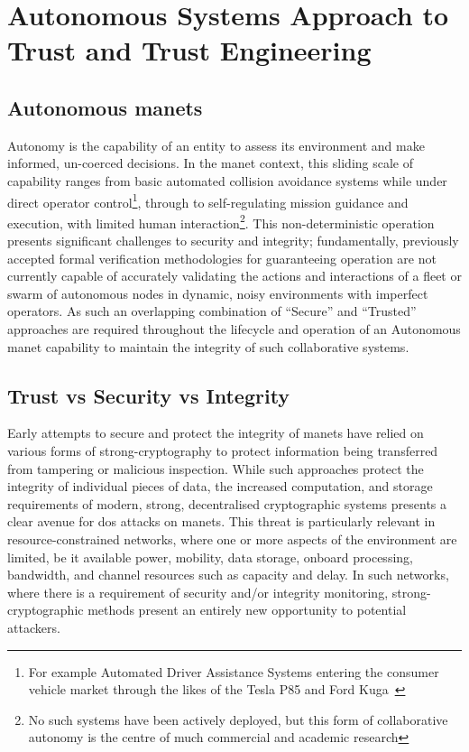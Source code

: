 \section{Autonomous Systems Approach to Trust and Trust Engineering}

\subsection{Autonomous \glspl{manet}}
Autonomy is the capability of an entity to assess its environment and make informed, un-coerced decisions.
In the \gls{manet} context, this sliding scale of capability ranges from basic automated collision avoidance systems while under direct operator control\footnote{For example Automated Driver Assistance Systems entering the consumer vehicle market through the likes of the Tesla P85 and Ford Kuga~\cite{Sawade2016}}, through to self-regulating mission guidance and execution, with limited human interaction\footnote{No such systems have been actively deployed, but this form of collaborative autonomy is the centre of much commercial and academic research\cite{Rajesh2015,Autefage2015,Teke2015}}.
This non-deterministic operation presents significant challenges to security and integrity; fundamentally, previously accepted formal verification methodologies for guaranteeing operation are not currently capable of accurately validating the actions and interactions of a fleet or swarm of autonomous nodes in dynamic, noisy environments with imperfect operators\cite{Teke2015}. 
As such an overlapping combination of ``Secure'' and ``Trusted'' approaches are required throughout the lifecycle and operation of an Autonomous \gls{manet} capability to maintain the integrity of such collaborative systems.

\subsection{Trust vs Security vs Integrity}

Early attempts to secure and protect the integrity of \glspl{manet} have relied on various forms of strong-cryptography to protect information being transferred from tampering or malicious inspection.
While such approaches protect the integrity of individual pieces of data, the increased computation, and storage requirements of modern, strong, decentralised cryptographic systems presents a clear avenue for \gls{dos} attacks on \glspl{manet}.
This threat is particularly relevant in resource-constrained networks, where one or more aspects of the environment are limited, be it available power, mobility, data storage, onboard processing, bandwidth, and channel resources such as capacity and delay.
In such networks, where there is a requirement of security and/or integrity monitoring, strong-cryptographic methods present an entirely new opportunity to potential attackers.

